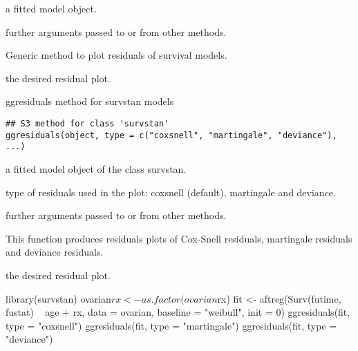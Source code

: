 \documentclass[letterpaper]{book}
\begin{document}
%
\begin{Arguments}
\begin{ldescription}
\item[\code{object}] a fitted model object.

\item[\code{...}] further arguments passed to or from other methods.
\end{ldescription}
\end{Arguments}
%
\begin{Details}\relax
Generic method to plot residuals of survival models.
\end{Details}
%
\begin{Value}
the desired residual plot.
\end{Value}
%
\begin{Description}\relax
ggresiduals method for survstan models
\end{Description}
%
\begin{Usage}
\begin{verbatim}
## S3 method for class 'survstan'
ggresiduals(object, type = c("coxsnell", "martingale", "deviance"), ...)
\end{verbatim}
\end{Usage}
%
\begin{Arguments}
\begin{ldescription}
\item[\code{object}] a fitted model object of the class survstan.

\item[\code{type}] type of residuals used in the plot: coxsnell (default), martingale and deviance.

\item[\code{...}] further arguments passed to or from other methods.
\end{ldescription}
\end{Arguments}
%
\begin{Details}\relax
This function produces residuals plots of Cox-Snell residuals, martingale residuals and deviance residuals.
\end{Details}
%
\begin{Value}
the desired residual plot.
\end{Value}
%
\begin{Examples}
\begin{ExampleCode}

library(survstan)
ovarian$rx <- as.factor(ovarian$rx)
fit <- aftreg(Surv(futime, fustat) ~ age + rx, data = ovarian, baseline = "weibull", init = 0)
ggresiduals(fit, type = "coxsnell")
ggresiduals(fit, type = "martingale")
ggresiduals(fit, type = "deviance")


\end{ExampleCode}
\end{Examples}
\end{document}
